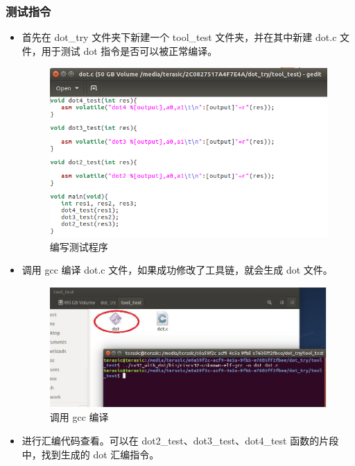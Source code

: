 \documentclass[a4paper, 14pt, oneside]{book} %
\numberwithin{equation}{subsection}
\begin{document}
		\subsubsection{测试指令}
			\begin{itemize}
				\item 首先在 dot\_try 文件夹下新建一个 tool\_test
				文件夹，并在其中新建 dot.c 文件，用于测试 dot 指令是否可以被正常编译。
					\begin{figure}[H]
						\centering  
						\includegraphics[scale=0.6]{img/6.png} 
						\caption{编写测试程序}
					\end{figure}
				\item 调用 gcc 编译 dot.c 文件，如果成功修改了工具链，就会生成 dot 文件。
					\begin{figure}[H]
						\centering  
						\includegraphics[scale=0.8]{img/makedot.JPG} 
						\caption{调用 gcc 编译}
					\end{figure}
				\item 进行汇编代码查看。可以在 dot2\_test、dot3\_test、dot4\_test 函数的片段中，找到生成的 dot 汇编指令。
					\begin{figure}[H]
						\centering  

\end{figure}
\end{itemize}
\end{document}
